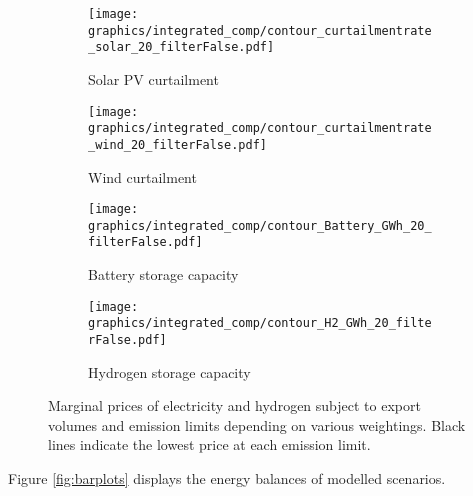 \begin{figure*}[t] %
    \centering
    \begin{subfigure}[b]{0.45\linewidth}
        \centering
        \texttt{[image: graphics/integrated\_comp/contour\_curtailmentrate\_solar\_20\_filterFalse.pdf]}
        \caption{Solar PV curtailment}
        \label{fig:solar_curt}
    \end{subfigure}
    \hfill
    \begin{subfigure}[b]{0.45\linewidth}
        \centering
        \texttt{[image: graphics/integrated\_comp/contour\_curtailmentrate\_wind\_20\_filterFalse.pdf]}
        \caption{Wind curtailment}
        \label{fig:wind_curt}
    \end{subfigure}
    \hfill
    \begin{subfigure}[b]{0.45\linewidth}
        \centering
        \texttt{[image: graphics/integrated\_comp/contour\_Battery\_GWh\_20\_filterFalse.pdf]}
        \caption{Battery storage capacity}
        \label{fig:battery_cap}
    \end{subfigure}
    \hfill
    \begin{subfigure}[b]{0.45\linewidth}
        \centering
        \texttt{[image: graphics/integrated\_comp/contour\_H2\_GWh\_20\_filterFalse.pdf]}
        \caption{Hydrogen storage capacity}
        \label{fig:hystorage_cap}
    \end{subfigure}
    \hfill

    \caption{Marginal prices of electricity and hydrogen subject to export volumes and emission limits depending on various weightings. Black lines indicate the lowest price at each emission limit.}
    \label{fig:integration_options}
\end{figure*}

Figure \ref{fig:barplots} displays the energy balances of modelled scenarios.


